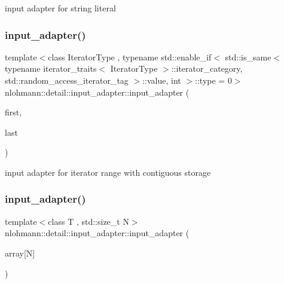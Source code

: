 input adapter for string literal 

\mbox{\label{classnlohmann_1_1detail_1_1input__adapter_ad6824b0f792691f75186c527fa31a6b4}} 
\subsubsection{\texorpdfstring{input\_adapter()}{input\_adapter()}\hspace{0.1cm}{\footnotesize\ttfamily [9/11]}}
{\footnotesize\ttfamily template$<$class Iterator\+Type , typename std\+::enable\+\_\+if$<$ std\+::is\+\_\+same$<$ typename iterator\+\_\+traits$<$ Iterator\+Type $>$\+::iterator\+\_\+category, std\+::random\+\_\+access\+\_\+iterator\+\_\+tag $>$\+::value, int $>$\+::type  = 0$>$ \\
nlohmann\+::detail\+::input\+\_\+adapter\+::input\+\_\+adapter (\begin{DoxyParamCaption}\item[{Iterator\+Type}]{first,  }\item[{Iterator\+Type}]{last }\end{DoxyParamCaption})\hspace{0.3cm}{\ttfamily [inline]}}



input adapter for iterator range with contiguous storage 

\mbox{\label{classnlohmann_1_1detail_1_1input__adapter_aa2392138bf8307df1994dc7eb22d51ce}} 
\subsubsection{\texorpdfstring{input\_adapter()}{input\_adapter()}\hspace{0.1cm}{\footnotesize\ttfamily [10/11]}}
{\footnotesize\ttfamily template$<$class T , std\+::size\+\_\+t N$>$ \\
nlohmann\+::detail\+::input\+\_\+adapter\+::input\+\_\+adapter (\begin{DoxyParamCaption}\item[{\mbox{\hyperlink{_keyboard_event_8h_adf1f3edb9115acb0a1e04209b7a9937b}{T}}(\&)}]{array\mbox{[}\+N\mbox{]} }\end{DoxyParamCaption})\hspace{0.3cm}{\ttfamily [inline]}}



